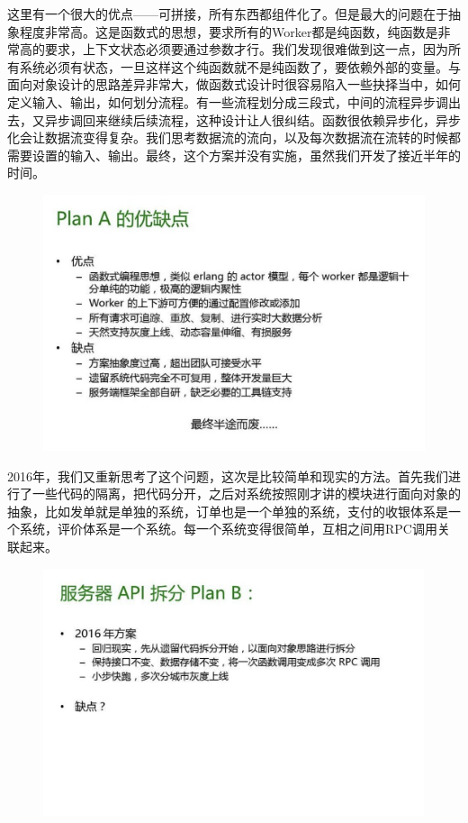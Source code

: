 \documentclass[12pt]{article}
\begin{document}
这里有一个很大的优点——可拼接，所有东西都组件化了。但是最大的问题在于抽象程度非常高。这是函数式的思想，要求所有的Worker都是纯函数，纯函数是非常高的要求，上下文状态必须要通过参数才行。我们发现很难做到这一点，因为所有系统必须有状态，一旦这样这个纯函数就不是纯函数了，要依赖外部的变量。与面向对象设计的思路差异非常大，做函数式设计时很容易陷入一些抉择当中，如何定义输入、输出，如何划分流程。有一些流程划分成三段式，中间的流程异步调出去，又异步调回来继续后续流程，这种设计让人很纠结。函数很依赖异步化，异步化会让数据流变得复杂。我们思考数据流的流向，以及每次数据流在流转的时候都需要设置的输入、输出。最终，这个方案并没有实施，虽然我们开发了接近半年的时间。

\begin{figure}[H]
    \centering
    \includegraphics[width=1\textwidth]{fig/DIDI_Reconstruction_19.png}
\end{figure}

2016年，我们又重新思考了这个问题，这次是比较简单和现实的方法。首先我们进行了一些代码的隔离，把代码分开，之后对系统按照刚才讲的模块进行面向对象的抽象，比如发单就是单独的系统，订单也是一个单独的系统，支付的收银体系是一个系统，评价体系是一个系统。每一个系统变得很简单，互相之间用RPC调用关联起来。

\begin{figure}[H]
    \centering
    \includegraphics[width=1\textwidth]{fig/DIDI_Reconstruction_20.png}
\end{figure}
\end{document}
